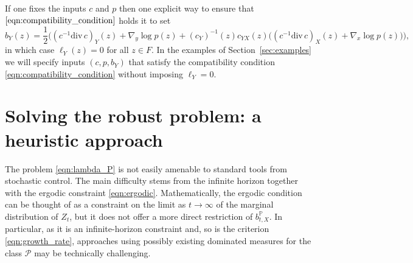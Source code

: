 \documentclass{article}
\theoremstyle{plain}
\theoremstyle{definition}
\renewcommand{\P}{\mathbb{P}}
\newcommand{\Pcal}{{\mathcal P}}
\numberwithin{lem}{section}
\begin{document}
If one fixes the inputs $c$ and $p$ then one explicit way to ensure that $\eqref{eqn:compatibility_condition}$ holds it to  set
\begin{equation} \label{eqn:explicit_compatability}
    b_Y(z) = \frac{1}{2}\Big((c^{-1}\mathrm{div} \, c)_Y(z) + \nabla_y \log p(z) +(c_Y)^{-1}(z)c_{YX}(z)\big((c^{-1}\mathrm{div}\, c)_X(z) + \nabla_x \log p(z)\big)\Big),
\end{equation}
in which case $\ell_Y(z) = 0$ for all $z \in F$. In the examples of Section~\ref{sec:examples} we will specify inputs $(c,p,b_Y)$ that satisfy the compatibility condition \eqref{eqn:compatibility_condition} without imposing $\ell_Y = 0$.





\section{Solving the robust problem: a heuristic approach} \label{sec:heuristic}
The problem \eqref{eqn:lambda_P} is not easily amenable to standard tools from stochastic control. The main difficulty stems from the infinite horizon together with the ergodic constraint \eqref{eqn:ergodic}. Mathematically, the ergodic condition can be thought of as a constraint on the limit as $t \to \infty$ of the marginal distribution of $Z_t$, but it does not offer a more direct restriction of $b_{t,X}^{\P}$. In particular, as it is an infinite-horizon constraint and, so is the criterion \eqref{eqn:growth_rate}, approaches using possibly existing dominated measures for the class $\Pcal$ may be technically challenging.
\end{document}
